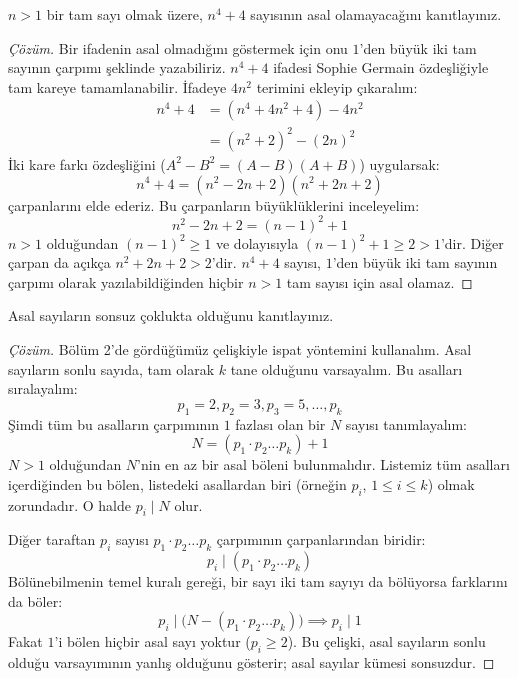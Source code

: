 \begin{example}
$n > 1$ bir tam sayı olmak üzere, $n^4 + 4$ sayısının asal olamayacağını kanıtlayınız.
\end{example}

\begin{proof}[Çözüm]
Bir ifadenin asal olmadığını göstermek için onu $1$'den büyük iki tam sayının çarpımı şeklinde yazabiliriz. $n^4 + 4$ ifadesi Sophie Germain özdeşliğiyle tam kareye tamamlanabilir. İfadeye $4n^2$ terimini ekleyip çıkaralım:
\begin{align*}
n^4 + 4 &= (n^4 + 4n^2 + 4) - 4n^2 \\
        &= (n^2 + 2)^2 - (2n)^2
\end{align*}
İki kare farkı özdeşliğini ($A^2 - B^2 = (A-B)(A+B)$) uygularsak:
\[ n^4 + 4 = (n^2 - 2n + 2)(n^2 + 2n + 2) \]
çarpanlarını elde ederiz. Bu çarpanların büyüklüklerini inceleyelim:
\[ n^2 - 2n + 2 = (n-1)^2 + 1 \]
$n > 1$ olduğundan $(n-1)^2 \ge 1$ ve dolayısıyla $(n-1)^2 + 1 \ge 2 > 1$'dir.
Diğer çarpan da açıkça $n^2 + 2n + 2 > 2$'dir.
$n^4 + 4$ sayısı, $1$'den büyük iki tam sayının çarpımı olarak yazılabildiğinden hiçbir $n > 1$ tam sayısı için asal olamaz.
\end{proof}

\begin{example}
Asal sayıların sonsuz çoklukta olduğunu kanıtlayınız.
\end{example}

\begin{proof}[Çözüm]
Bölüm 2'de gördüğümüz çelişkiyle ispat yöntemini kullanalım. Asal sayıların sonlu sayıda, tam olarak $k$ tane olduğunu varsayalım. Bu asalları sıralayalım:
\[ p_1 = 2, p_2 = 3, p_3 = 5, \dots, p_k \]
Şimdi tüm bu asalların çarpımının $1$ fazlası olan bir $N$ sayısı tanımlayalım:
\[ N = (p_1 \cdot p_2 \dots p_k) + 1 \]
$N > 1$ olduğundan $N$'nin en az bir asal böleni bulunmalıdır. Listemiz tüm asalları içerdiğinden bu bölen, listedeki asallardan biri (örneğin $p_i$, $1 \le i \le k$) olmak zorundadır.
O halde $p_i \mid N$ olur.

Diğer taraftan $p_i$ sayısı $p_1 \cdot p_2 \dots p_k$ çarpımının çarpanlarından biridir:
\[ p_i \mid (p_1 \cdot p_2 \dots p_k) \]
Bölünebilmenin temel kuralı gereği, bir sayı iki tam sayıyı da bölüyorsa farklarını da böler:
\[ p_i \mid \Big( N - (p_1 \cdot p_2 \dots p_k) \Big) \implies p_i \mid 1 \]
Fakat $1$'i bölen hiçbir asal sayı yoktur ($p_i \ge 2$). Bu çelişki, asal sayıların sonlu olduğu varsayımının yanlış olduğunu gösterir; asal sayılar kümesi sonsuzdur.
\end{proof}

